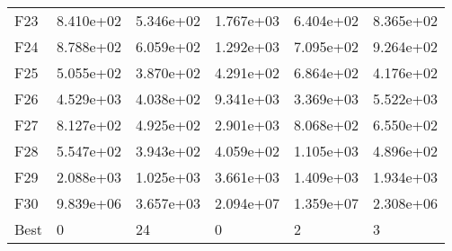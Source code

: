 \begin{tabular}{llllll}
F23  &  8.410e+02 &  5.346e+02 &  1.767e+03 &  6.404e+02 &  8.365e+02 \\
F24  &  8.788e+02 &  6.059e+02 &  1.292e+03 &  7.095e+02 &  9.264e+02 \\
F25  &  5.055e+02 &  3.870e+02 &  4.291e+02 &  6.864e+02 &  4.176e+02 \\
F26  &  4.529e+03 &  4.038e+02 &  9.341e+03 &  3.369e+03 &  5.522e+03 \\
F27  &  8.127e+02 &  4.925e+02 &  2.901e+03 &  8.068e+02 &  6.550e+02 \\
F28  &  5.547e+02 &  3.943e+02 &  4.059e+02 &  1.105e+03 &  4.896e+02 \\
F29  &  2.088e+03 &  1.025e+03 &  3.661e+03 &  1.409e+03 &  1.934e+03 \\
F30  &  9.839e+06 &  3.657e+03 &  2.094e+07 &  1.359e+07 &  2.308e+06 \\
Best &          0 &         24 &          0 &          2 &          3 \\
\bottomrule
\end{tabular}
